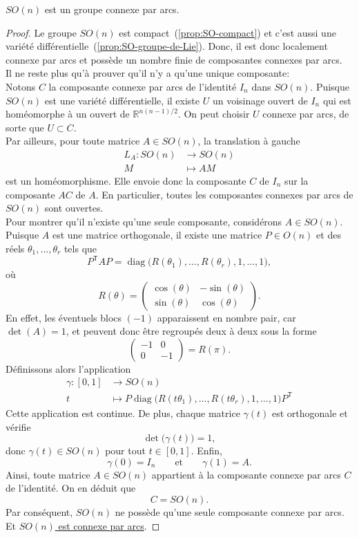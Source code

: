 \documentclass[12pt]{report}
\begin{document}
\begin{proposition}\label{prop:SO-connexe-arcs}
$SO(n)$ est un groupe connexe par arcs.
\end{proposition}

\begin{proof}
Le groupe $SO(n)$ est compact~(\ref{prop:SO-compact}) et c'est aussi une variété différentielle~(\ref{prop:SO-groupe-de-Lie}). Donc, il est donc localement connexe par arcs et possède un nombre finie de composantes connexes par arcs.\\
Il ne reste plus qu'à prouver qu'il n'y a qu'une unique composante:\\
Notons $C$ la composante connexe par arcs de l'identité $I_n$ dans $SO(n)$. Puisque $SO(n)$ est une variété différentielle, il existe $U$ un voisinage ouvert de $I_n$ qui est homéomorphe à un ouvert de $\mathbb{R}^{n(n-1)/2}$. On peut choisir $U$ connexe par arcs, de sorte que $U\subset C$.\\
Par ailleurs, pour toute matrice $A\in SO(n)$, la translation à gauche
\[
\begin{aligned}
L_A\colon SO(n)&\longrightarrow SO(n)\\
M&\longmapsto AM
\end{aligned}
\]
est un homéomorphisme. Elle envoie donc la composante $C$ de $I_n$ sur la composante $AC$ de $A$. En particulier, toutes les composantes connexes par arcs de $SO(n)$ sont ouvertes.\\
Pour montrer qu'il n'existe qu'une seule composante, considérons $A\in SO(n)$. Puisque $A$ est une matrice orthogonale, il existe une matrice $P\in O(n)$ et des réels $\theta_1,\ldots,\theta_r$ tels que
\[
P^{\mathsf T}AP=\operatorname{diag}\bigl(R(\theta_1),\ldots,R(\theta_r),1,\ldots,1\bigr),
\]
où
\[
R(\theta)=\begin{pmatrix}\cos(\theta)&-\sin(\theta)\\\sin(\theta)&\cos(\theta)\end{pmatrix}.
\]
En effet, les éventuels blocs $(-1)$ apparaissent en nombre pair, car $\det(A)=1$, et peuvent donc être regroupés deux à deux sous la forme
\[
\begin{pmatrix}-1&0\\0&-1\end{pmatrix}=R(\pi).
\]
Définissons alors l'application
\[
\begin{aligned}
\gamma\colon[0,1]&\longrightarrow SO(n)\\
t&\longmapsto P\operatorname{diag}\bigl(R(t\theta_1),\ldots,R(t\theta_r),1,\ldots,1\bigr)P^{\mathsf T}
\end{aligned}
\]
Cette application est continue. De plus, chaque matrice $\gamma(t)$ est orthogonale et vérifie
\[
\det\bigl(\gamma(t)\bigr)=1,
\]
donc $\gamma(t)\in SO(n)$ pour tout $t\in[0,1]$. Enfin,
\[
\gamma(0)=I_n \qquad\text{et}\qquad \gamma(1)=A.
\]
Ainsi, toute matrice $A\in SO(n)$ appartient à la composante connexe par arcs $C$ de l'identité. On en déduit que
\[
C=SO(n).
\]
Par conséquent, $SO(n)$ ne possède qu'une seule composante connexe par arcs.\\
Et \underline{$SO(n)$ est connexe par arcs}.
\end{proof}
\end{document}
